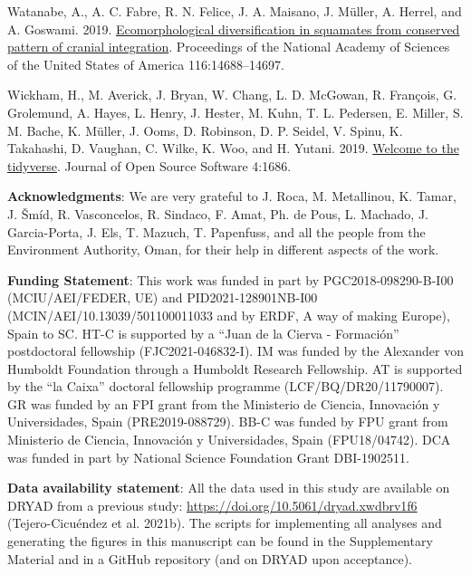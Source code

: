 \documentclass[
  11pt,
]{article}
\newlength{\cslhangindent}
\newlength{\cslentryspacingunit} %
\newenvironment{CSLReferences}[2] %
 {%
  \setlength{\parindent}{0pt}
  \ifodd #1
  \let\oldpar\par
  \def\par{\hangindent=\cslhangindent\oldpar}
  \fi
  \setlength{\parskip}{#2\cslentryspacingunit}
 }%
 {}
\begin{document}
\begin{CSLReferences}{1}{0}
\leavevmode{}%
Watanabe, A., A. C. Fabre, R. N. Felice, J. A. Maisano, J. Müller, A.
Herrel, and A. Goswami. 2019.
\href{https://doi.org/10.1073/pnas.1820967116}{{Ecomorphological
diversification in squamates from conserved pattern of cranial
integration}}. Proceedings of the National Academy of Sciences of the
United States of America 116:14688--14697.

\leavevmode{}%
Wickham, H., M. Averick, J. Bryan, W. Chang, L. D. McGowan, R. François,
G. Grolemund, A. Hayes, L. Henry, J. Hester, M. Kuhn, T. L. Pedersen, E.
Miller, S. M. Bache, K. Müller, J. Ooms, D. Robinson, D. P. Seidel, V.
Spinu, K. Takahashi, D. Vaughan, C. Wilke, K. Woo, and H. Yutani. 2019.
\href{https://doi.org/10.21105/joss.01686}{Welcome to the {tidyverse}}.
Journal of Open Source Software 4:1686.

\end{CSLReferences}

\newpage

\hfill\break

\textbf{Acknowledgments}: We are very grateful to J. Roca, M.
Metallinou, K. Tamar, J. Šmíd, R. Vasconcelos, R. Sindaco, F. Amat, Ph.
de Pous, L. Machado, J. Garcia-Porta, J. Els, T. Mazuch, T. Papenfuss,
and all the people from the Environment Authority, Oman, for their help
in different aspects of the work.

\textbf{Funding Statement}: This work was funded in part by
PGC2018-098290-B-I00 (MCIU/AEI/FEDER, UE) and PID2021-128901NB-I00
(MCIN/AEI/10.13039/501100011033 and by ERDF, A way of making Europe),
Spain to SC. HT-C is supported by a ``Juan de la Cierva - Formación''
postdoctoral fellowship (FJC2021-046832-I). IM was funded by the
Alexander von Humboldt Foundation through a Humboldt Research
Fellowship. AT is supported by the ``la Caixa'' doctoral fellowship
programme (LCF/BQ/DR20/11790007). GR was funded by an FPI grant from the
Ministerio de Ciencia, Innovación y Universidades, Spain
(PRE2019-088729). BB-C was funded by FPU grant from Ministerio de
Ciencia, Innovación y Universidades, Spain (FPU18/04742). DCA was funded
in part by National Science Foundation Grant DBI-1902511.

\textbf{Data availability statement}: All the data used in this study
are available on DRYAD from a previous study:
\url{https://doi.org/10.5061/dryad.xwdbrv1f6} (Tejero-Cicuéndez et al.
2021b). The scripts for implementing all analyses and generating the
figures in this manuscript can be found in the Supplementary Material
and in a GitHub repository (and on DRYAD upon acceptance).
\end{document}
